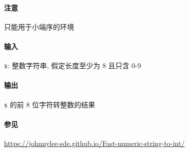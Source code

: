 \paragraph{注意}

只能用于小端序的环境

\paragraph{输入}

\verb|s|: 整数字符串, 假定长度至少为 8 且只含 0-9

\paragraph{输出}

\verb|s| 的前 8 位字符转整数的结果

\paragraph{参见}

\url{https://johnnylee-sde.github.io/Fast-numeric-string-to-int/}
